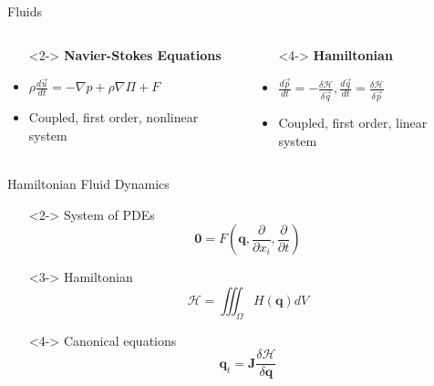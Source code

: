 \documentclass{beamer}
\begin{document}
			\begin{frame}[t]{Fluids}
				\begin{columns}
					\begin{column}{0.5\textwidth}
						\begin{itemize}
							\item[]<2-> \textbf{Navier-Stokes Equations}
							\item<3-> $\rho\frac{d \vec u}{dt} = -\nabla p + \rho \nabla \Pi + F$
							\item<3-> Coupled, first order, nonlinear system
						\end{itemize}
					\end{column}
					\begin{column}{0.5\textwidth}
						\begin{itemize}
							\item[]<4-> \textbf{Hamiltonian}
							\item<5-> $\frac{d \vec p}{dt} = -\frac{\delta \mathcal{H}}{\delta \vec q}, \frac{d \vec q}{dt} = \frac{\delta \mathcal{H}}{\delta \vec p}$
							\item<5-> Coupled, first order, linear system
						\end{itemize}
					\end{column}
				\end{columns}
			\end{frame}
			\begin{frame}[t]{Hamiltonian Fluid Dynamics}
				\begin{itemize}
					\item[]<2-> System of PDEs $$\mathbf{0} = F\left(\mathbf{q}, \frac{\partial}{\partial x_i}, \frac{\partial}{\partial t} \right)$$
					\item[]<3-> Hamiltonian $$\mathcal{H} = \iiint_\Omega H(\mathbf{q}) dV$$
					\item[]<4-> Canonical equations $$\mathbf{q}_t = \mathbf{J}\frac{\delta \mathcal{H}}{\delta \mathbf{q}}$$
				\end{itemize}
			\end{frame}
\end{document}
